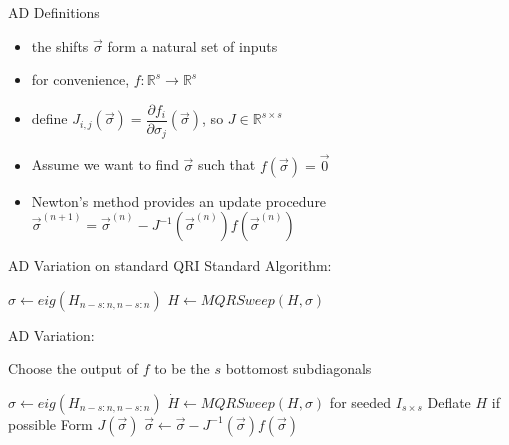 \documentclass[12pt]{beamer}
\renewcommand{\d}[1]{\dot{#1}}
\begin{document}
  \begin{frame}{AD Definitions}
    \begin{itemize}
      \item the shifts $\vec{\sigma}$ form a natural set of inputs
      \item for convenience, $f:\mathbb{R}^s \to \mathbb{R}^s$
      \item define $J_{i,j}(\vec{\sigma}) = \dfrac{\partial f_i}{\partial \sigma_j}(\vec{\sigma})$, so $J \in \mathbb{R}^{s \times s}$
      \item Assume we want to find $\vec{\sigma}$ such that $f(\vec{\sigma}) = \vec{0}$
      \item Newton's method provides an update procedure $\vec{\sigma}^{(n+1)} = \vec{\sigma}^{(n)} - J^{-1}(\vec{\sigma}^{(n)}) f(\vec{\sigma}^{(n)})$
    \end{itemize}
  \end{frame}


  \begin{frame}{AD Variation on standard QRI}
    Standard Algorithm:
    \begin{algorithmic}
      \Repeat
        \State $\sigma \gets eig(H_{n-s:n,n-s:n})$ 
        \State $H \gets MQRSweep(H,\sigma)$ 
    \end{algorithmic}

    AD Variation:
    
    Choose the output of $f$ to be the $s$ bottomost subdiagonals

    \begin{algorithmic}
      \State $\sigma \gets eig(H_{n-s:n,n-s:n})$ 
      \Repeat
        \State $\d{H} \gets MQRSweep(H,\sigma)$ for seeded $I_{s \times s}$
        \State Deflate $H$ if possible
        \State Form $J(\vec{\sigma})$
        \State $\vec{\sigma} \gets \vec{\sigma} - J^{-1}(\vec{\sigma}) f(\vec{\sigma})$
    \end{algorithmic}

  \end{frame}
\end{document}

